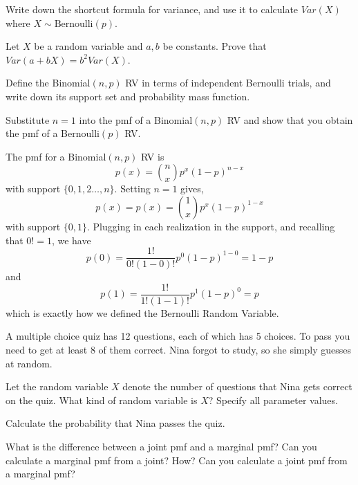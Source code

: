 \documentclass[addpoints,12pt]{exam}
\begin{document}
\begin{questions}
\question Write down the shortcut formula for variance, and use it to calculate $Var(X)$ where $X\sim\mbox{Bernoulli}(p)$. 

\question Let $X$ be a random variable and $a,b$ be constants. 
Prove that $Var(a + bX) = b^2 Var(X)$.

\question Define the Binomial$(n,p)$ RV in terms of independent Bernoulli trials, and write down its support set and probability mass function.

\question Substitute $n=1$ into the pmf of a Binomial$(n,p)$ RV and show that you obtain the pmf of a Bernoulli$(p)$ RV.
	\begin{solution}
		The pmf for a Binomial$(n,p)$ RV is
		$$p(x) = {n \choose x} p^x (1-p)^{n-x}$$
		with support $\{0, 1, 2\hdots, n\}$. Setting $n=1$ gives,
		$$p(x) = p(x) = {1 \choose x} p^x (1-p)^{1-x}$$
		with support $\{0,1\}$. Plugging in each realization in the support, and recalling that $0! = 1$, we have
			$$p(0) = \frac{1!}{0!(1-0)!} p^0 (1-p)^{1-0} = 1 - p$$
		and
		$$p(1) = \frac{1!}{1!(1-1)!} p^1 (1-p)^0 = p$$
		which is exactly how we defined the Bernoulli Random Variable.
	\end{solution}

\question A multiple choice quiz has 12 questions, each of which has 5 choices. To pass you need to get at least 8 of them correct. Nina forgot to study, so she simply guesses at random.
\begin{parts}
  \item Let the random variable $X$ denote the number of questions that Nina gets correct on the quiz. What kind of random variable is $X$? Specify all parameter values.
  \item Calculate the probability that Nina passes the quiz.
\end{parts}

		

\question What is the difference between a joint pmf and a marginal pmf? Can you calculate a marginal pmf from a joint? How? Can you calculate a joint pmf from a marginal pmf?


\end{questions}
\end{document}
